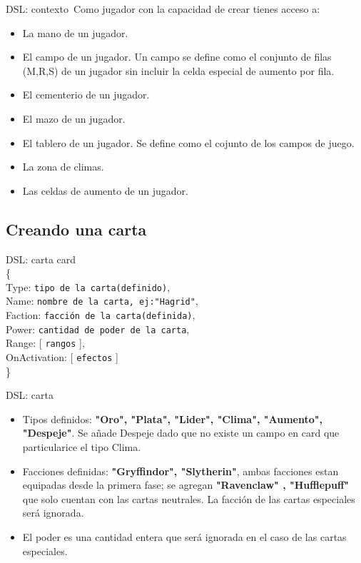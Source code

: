 \documentclass[a4paper, 12pt]{beamer}
\begin{document}
\begin{frame}{\textcolor{plata}{DSL: contexto}}\
Como jugador con la capacidad de crear tienes acceso a:
\begin{itemize}
\item La mano de un jugador.
\item El campo de un jugador. Un campo se define como el conjunto de filas (M,R,S) de un jugador sin incluir la celda especial de aumento por fila.
\item El cementerio de un jugador.
\item El mazo de un jugador.
\item El tablero de un jugador. Se define como el cojunto de los campos de juego.
\item La zona de climas.
\item Las celdas de aumento de un jugador.
\end{itemize}
\end{frame}

\subsection{Creando una carta}
\begin{frame}{\textcolor{plata}{DSL: carta}}
card\\
\{\\
\hspace{1cm} Type: \texttt{tipo de la carta(definido)},\\
\hspace{1cm} Name: \texttt{nombre de la carta, ej:"Hagrid"},\\
\hspace{1cm} Faction: \texttt{facción de la carta(definida)},\\
\hspace{1cm} Power: \texttt{cantidad de poder de la carta},\\
\hspace{1cm} Range: [ \texttt{rangos} ],\\
\hspace{1cm} OnActivation: [ \texttt{efectos} ]\\
\}
\end{frame}

\begin{frame}{\textcolor{plata}{DSL: carta}}
\begin{itemize}
\item Tipos definidos: \textbf{"Oro", "Plata", "Lider", "Clima", "Aumento", "Despeje"}. Se añade Despeje dado que no existe un campo en card que particularice el tipo Clima.
\item Facciones definidas: \textbf{"Gryffindor", "Slytherin"}, ambas facciones estan equipadas desde la primera fase; se agregan \textbf{"Ravenclaw" , "Hufflepuff"} que solo cuentan con las cartas neutrales. La facción de las cartas especiales será ignorada.
\item El poder es una cantidad entera que será ignorada en el caso de las cartas especiales.
\end{itemize}
\end{frame}
\end{document}
